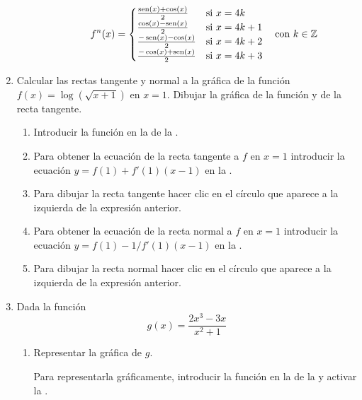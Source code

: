\begin{enumerate}[leftmargin=*]
\begin{enumerate}
\begin{indication}
\begin{enumerate}
                  \[
                  f^n(x)=
                  \begin{cases}
                  \frac{\operatorname{sen}(x)+\cos(x)}{2}  & \mbox{si $x=4k$}   \\
                  \frac{\cos(x)-\operatorname{sen}(x)}{2}  & \mbox{si $x=4k+1$} \\
                  \frac{-\operatorname{sen}(x)-\cos(x)}{2} & \mbox{si $x=4k+2$} \\
                  \frac{-\cos(x)+\operatorname{sen}(x)}{2} & \mbox{si $x=4k+3$} \\
                  \end{cases}
                  \quad \mbox{con $k\in \mathbb{Z}$}
                  \]
            \end{enumerate}
            \end{indication}
      \end{enumerate}

\item Calcular las rectas tangente y normal a la gráfica de la función $f(x)=\log(\sqrt{x+1})$ en $x=1$.
      Dibujar la gráfica de la función y de la recta tangente.
      \begin{indication}
      \begin{enumerate}
      \item Introducir la función  en la  de la .
      \item Para obtener la ecuación de la recta tangente a $f$ en $x=1$ introducir la ecuación $y=f(1)+f'(1)(x-1)$ en la .
      \item Para dibujar la recta tangente hacer clic en el círculo que aparece a la izquierda de la expresión anterior.
      \item Para obtener la ecuación de la recta normal a $f$ en $x=1$ introducir la ecuación $y=f(1)-1/f'(1)(x-1)$ en la .
      \item Para dibujar la recta normal hacer clic en el círculo que aparece a la izquierda de la expresión anterior.
      \end{enumerate}
      \end{indication}



\item Dada la función
      \[
      g(x)=\dfrac{2x^{3}-3x}{x^{2}+1}
      \]

      \begin{enumerate}
      \item Representar la gráfica de $g$.
            \begin{indication}
            Para representarla gráficamente, introducir la función  en la  de la  y activar la .
            \end{indication}


\end{enumerate}
\end{enumerate}
